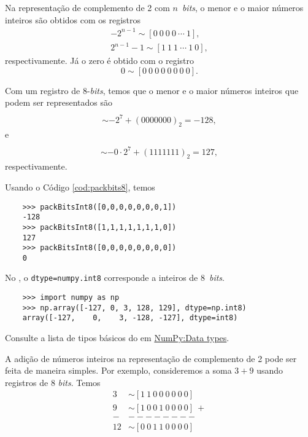 Na representação de complemento de 2 com $n$~{\it bits}, o menor e o maior números inteiros são obtidos com os registros
\begin{gather}
  -2^{n-1} \sim [0 ~ 0 ~ 0 ~ 0 ~ \cdots ~ 1],\\
  2^{n-1}-1 \sim [1 ~ 1 ~ 1 ~ \cdots ~ 1 ~ 0],
\end{gather}
respectivamente. Já o zero é obtido com o registro
\begin{equation}
  0 \sim [0 ~ 0 ~ 0 ~ 0 ~ 0 ~ 0 ~ 0 ~ 0].
\end{equation}

\begin{ex}
  Com um registro de $8$-{\it bits}, temos que o menor e o maior números inteiros que podem ser representados são
  \begin{gather}
    [0 ~ 0 ~ 0 ~ 0 ~ 0 ~ 0 ~ 0 ~ 1] \\
    \sim -2^{7} + (0000000)_2 = -128,
  \end{gather}
  e
  \begin{gather}
    [1 ~ 1 ~ 1 ~ 1 ~ 1 ~ 1 ~ 1 ~ 0] \\
    \sim -0\cdot 2^7 + (1111111)_2 = 127,
  \end{gather}
  respectivamente.

  Usando o Código \ref{cod:packbits8}, temos
  \begin{lstlisting}
    >>> packBitsInt8([0,0,0,0,0,0,0,1])
    -128
    >>> packBitsInt8([1,1,1,1,1,1,1,0])
    127
    >>> packBitsInt8([0,0,0,0,0,0,0,0])
    0
  \end{lstlisting}
\end{ex}

\begin{obs}
  No {\numpy}, o \lstinline+dtype=numpy.int8+ corresponde a inteiros de 8~{\it bits}.
  \begin{lstlisting}
    >>> import numpy as np
    >>> np.array([-127, 0, 3, 128, 129], dtype=np.int8)
    array([-127,    0,    3, -128, -127], dtype=int8)
  \end{lstlisting}
  Consulte a lista de tipos básicos do {\numpy} em \href{https://numpy.org/doc/stable/user/basics.types.html}{NumPy:Data types}.
\end{obs}

A adição de números inteiros na representação de complemento de 2 pode ser feita de maneira simples. Por exemplo, consideremos a soma $3 + 9$ usando registros de 8 {\it bits}. Temos
\begin{align}
  3 &\sim [1 ~ 1 ~ 0 ~ 0 ~ 0 ~ 0 ~ 0 ~ 0]\\
  9 &\sim [1 ~ 0 ~ 0 ~ 1 ~ 0 ~ 0 ~ 0 ~ 0] ~ + \\
  - & -------- \\
 12 &\sim [0 ~ 0 ~ 1 ~ 1 ~ 0 ~ 0 ~ 0 ~ 0]
\end{align}

